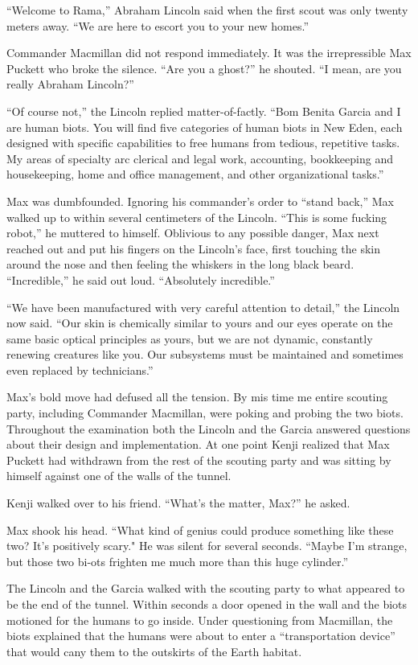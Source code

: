 \documentclass[]{article}
\begin{document}
{“Welcome to Rama,” Abraham Lincoln said when the first scout was only twenty meters away.  “We are here to escort you to your new homes.”

Commander Macmillan did not respond immediately.  It was the irrepressible Max Puckett who broke the silence.  “Are you a ghost?” he shouted.  “I mean, are you really Abraham Lincoln?”

“Of course not,” the Lincoln replied matter-of-factly.  “Bom Benita Garcia and I are human biots.  You will find five categories of human biots in New Eden, each designed with specific capabilities to free humans from tedious, repetitive tasks.  My areas of specialty arc clerical and legal work, accounting, bookkeeping and housekeeping, home and office management, and other organizational tasks.”

Max was dumbfounded.  Ignoring his commander’s order to “stand back,” Max walked up to within several centimeters of the Lincoln.  “This is some fucking robot,” he muttered to himself.  Oblivious to any possible danger, Max next reached out and put his fingers on the Lincoln’s face, first touching the skin around the nose and then feeling the whiskers in the long black beard.  “Incredible,” he said out loud.  “Absolutely incredible.”

“We have been manufactured with very careful attention to detail,” the Lincoln now said.  “Our skin is chemically similar to yours and our eyes operate on the same basic optical principles as yours, but we are not dynamic, constantly renewing creatures like you.  Our subsystems must be maintained and sometimes even replaced by technicians.”

Max’s bold move had defused all the tension.  By mis time me entire scouting party, including Commander Macmillan, were poking and probing the two biots.  Throughout the examination both the Lincoln and the Garcia answered questions about their design and implementation.  At one point Kenji realized that Max Puckett had withdrawn from the rest of the scouting party and was sitting by himself against one of the walls of the tunnel.

Kenji walked over to his friend.  “What’s the matter, Max?” he asked.

Max shook his head.  “What kind of genius could produce something like these two? It’s positively scary."  He was silent for several seconds.  “Maybe I’m strange, but those two bi-ots frighten me much more than this huge cylinder.”

The Lincoln and the Garcia walked with the scouting party to what appeared to be the end of the tunnel.  Within seconds a door opened in the wall and the biots motioned for the humans to go inside.  Under questioning from Macmillan, the biots explained that the humans were about to enter a “transportation device” that would cany them to the outskirts of the Earth habitat.

}
\end{document}
